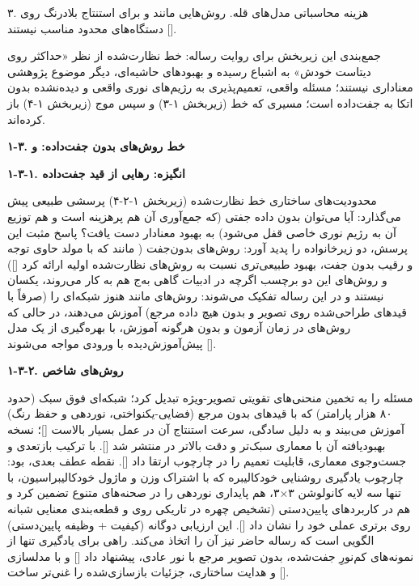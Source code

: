 \documentclass[12pt,a4paper]{article}
\begin{document}
۳. هزینه محاسباتی مدل‌های قله. روش‌هایی مانند  و  برای استنتاج بلادرنگ روی دستگاه‌های محدود مناسب نیستند [].\par
جمع‌بندی این زیربخش برای روایت رساله: خط نظارت‌شده از نظر «حداکثر  روی دیتاست خودش» به اشباع رسیده و بهبودهای حاشیه‌ای، دیگر موضوع پژوهشی معناداری نیستند؛ مسئله واقعی، تعمیم‌پذیری به رژیم‌های نوری واقعی و دیده‌نشده بدون اتکا به جفت‌داده است؛ مسیری که خط  (زیربخش ۱-۳) و سپس موج  (زیربخش ۱-۴) باز کرده‌اند.\par
\textbf{۱-۳. خط روش‌های بدون جفت‌داده:  و }\par
\textbf{۱-۳-۱. انگیزه: رهایی از قید جفت‌داده}\par
محدودیت‌های ساختاری خط نظارت‌شده (زیربخش ۱-۲-۴) پرسشی طبیعی پیش می‌گذارد: آیا می‌توان بدون داده جفتی (که جمع‌آوری آن هم پرهزینه است و هم توزیع آن به رژیم نوری خاصی قفل می‌شود) به بهبود معنادار دست یافت؟ پاسخ مثبت این پرسش، دو زیرخانواده را پدید آورد: روش‌های بدون‌جفت ( مانند  که با مولد حاوی توجه و رقیب بدون جفت، بهبود طبیعی‌تری نسبت به روش‌های نظارت‌شده اولیه ارائه کرد []) و روش‌های  این دو برچسب اگرچه در ادبیات گاهی به‌ج هم به کار می‌روند، یکسان نیستند و در این رساله تفکیک می‌شوند: روش‌های  مانند  هنوز شبکه‌ای را (صرفاً با قیدهای طراحی‌شده روی تصویر و بدون هیچ داده مرجع) آموزش می‌دهند، در حالی که روش‌های  در زمان آزمون و بدون هرگونه آموزش، با بهره‌گیری از یک مدل پیش‌آموزش‌دیده با ورودی مواجه می‌شوند [].\par
\textbf{۱-۳-۲. روش‌های شاخص }\par
{} مسئله را به تخمین منحنی‌های تقویتی تصویر-ویژه تبدیل کرد؛ شبکه‌ای فوق سبک (حدود ۸۰ هزار پارامتر) که با قیدهای بدون مرجع (فضایی-یکنواختی، نوردهی و حفظ رنگ) آموزش می‌بیند و به دلیل سادگی، سرعت استنتاج آن در عمل بسیار بالاست []؛ نسخه بهبودیافته آن با معماری سبک‌تر و دقت بالاتر در  منتشر شد [].  با ترکیب  بازتعدی  و جست‌وجوی معماری، قابلیت تعمیم را در چارچوب  ارتقا داد []. نقطه عطف بعدی،  بود: چارچوب یادگیری روشنایی خودکالیبره که با اشتراک وزن و ماژول خودکالیبراسیون، با تنها سه لایه کانولوشن ۳$\times$۳، هم پایداری نوردهی را در صحنه‌های متنوع تضمین کرد و هم در کاربردهای پایین‌دستی (تشخیص چهره در تاریکی روی  و قطعه‌بندی معنایی شبانه روی  برتری عملی خود را نشان داد []. این ارزیابی دوگانه (کیفیت + وظیفه پایین‌دستی) الگویی است که رساله حاضر نیز آن را اتخاذ می‌کند.  راهی برای یادگیری تنها از نمونه‌های کم‌نورِ جفت‌شده، بدون تصویر مرجع با نور عادی، پیشنهاد داد [] و  با مدلسازی و هدایت ساختاری، جزئیات بازسازی‌شده را غنی‌تر ساخت [].\par
\end{document}
